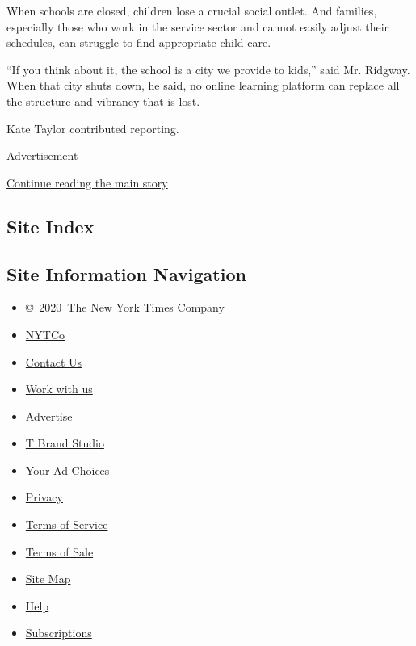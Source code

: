 When schools are closed, children lose a crucial social outlet. And
families, especially those who work in the service sector and cannot
easily adjust their schedules, can struggle to find appropriate child
care.

``If you think about it, the school is a city we provide to kids,'' said
Mr. Ridgway. When that city shuts down, he said, no online learning
platform can replace all the structure and vibrancy that is lost.

Kate Taylor contributed reporting.

Advertisement

\protect\hyperlink{after-bottom}{Continue reading the main story}

\hypertarget{site-index}{%
\subsection{Site Index}\label{site-index}}

\hypertarget{site-information-navigation}{%
\subsection{Site Information
Navigation}\label{site-information-navigation}}

\begin{itemize}
\tightlist
\item
  \href{https://help.nytimes3xbfgragh.onion/hc/en-us/articles/115014792127-Copyright-notice}{©~2020~The
  New York Times Company}
\end{itemize}

\begin{itemize}
\tightlist
\item
  \href{https://www.nytco.com/}{NYTCo}
\item
  \href{https://help.nytimes3xbfgragh.onion/hc/en-us/articles/115015385887-Contact-Us}{Contact
  Us}
\item
  \href{https://www.nytco.com/careers/}{Work with us}
\item
  \href{https://nytmediakit.com/}{Advertise}
\item
  \href{http://www.tbrandstudio.com/}{T Brand Studio}
\item
  \href{https://www.nytimes3xbfgragh.onion/privacy/cookie-policy\#how-do-i-manage-trackers}{Your
  Ad Choices}
\item
  \href{https://www.nytimes3xbfgragh.onion/privacy}{Privacy}
\item
  \href{https://help.nytimes3xbfgragh.onion/hc/en-us/articles/115014893428-Terms-of-service}{Terms
  of Service}
\item
  \href{https://help.nytimes3xbfgragh.onion/hc/en-us/articles/115014893968-Terms-of-sale}{Terms
  of Sale}
\item
  \href{https://spiderbites.nytimes3xbfgragh.onion}{Site Map}
\item
  \href{https://help.nytimes3xbfgragh.onion/hc/en-us}{Help}
\item
  \href{https://www.nytimes3xbfgragh.onion/subscription?campaignId=37WXW}{Subscriptions}
\end{itemize}
